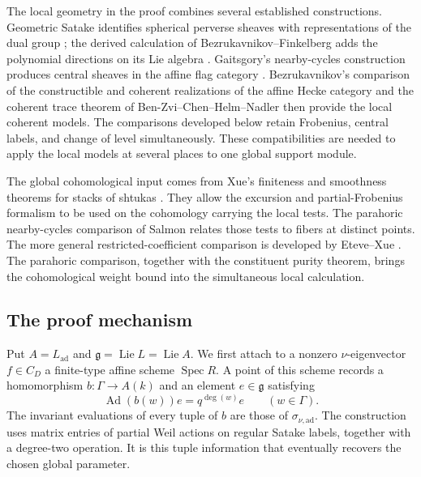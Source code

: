 \documentclass[11pt]{article}
\numberwithin{equation}{section}
\theoremstyle{definition}
\theoremstyle{remark}
\newcommand{\g}{\mathfrak g}
\newcommand{\Ad}{\operatorname{Ad}}
\newcommand{\Lie}{\operatorname{Lie}}
\newcommand{\Spec}{\operatorname{Spec}}
\begin{document}
The local geometry in the proof combines several established
constructions.  Geometric Satake identifies spherical perverse
sheaves with representations of the dual group
\cite{history:MV}; the derived calculation of
Bezrukavnikov--Finkelberg adds the polynomial directions on its
Lie algebra \cite{history:BF}.
Gaitsgory's nearby-cycles construction produces central sheaves
in the affine flag category \cite{history:Gaitsgory}.
Bezrukavnikov's comparison of the constructible and coherent
realizations of the affine Hecke category
\cite{Enh:Bezrukavnikov} and the coherent trace theorem of
Ben-Zvi--Chen--Helm--Nadler \cite{Local:BZCHN} then provide the
local coherent models.  The comparisons developed below retain
Frobenius, central labels, and change of level simultaneously.
These compatibilities are needed to apply the local models at
several places to one global support module.

The global cohomological input comes from Xue's finiteness and
smoothness theorems for stacks of shtukas
\cite{Bounds:XueFiniteness,Bounds:XueSmoothness}.
They allow the excursion and partial-Frobenius formalism to be
used on the cohomology carrying the local tests.  The parahoric nearby-cycles
comparison of Salmon \cite[Theorem~5.2(1)]{Bounds:SalmonNearby}
relates those tests to fibers at distinct points.  The more general
restricted-coefficient comparison is developed by Eteve--Xue
\cite{Bounds:EteveXueNearby}.  The parahoric comparison, together
with the constituent purity theorem, brings the cohomological
weight bound into the simultaneous local calculation.


\subsection{The proof mechanism}

Put $A=L_{\mathrm{ad}}$ and $\g=\Lie L=\Lie A$.
We first attach to a nonzero $\nu$-eigenvector $f\in C_D$ a
finite-type affine scheme $\Spec R$.  A point of this scheme records a homomorphism
$b:\Gamma\to A(k)$ and an element $e\in\g$ satisfying
\begin{equation}\label{intro:scaling}
       \Ad(b(w))e=q^{\deg(w)}e\qquad(w\in\Gamma).
\end{equation}
The invariant evaluations of every tuple of $b$ are those of
$\sigma_{\nu,\mathrm{ad}}$.  The construction uses matrix entries
of partial Weil actions on regular Satake labels, together with a
degree-two operation.  It is this tuple information that eventually
recovers the chosen global parameter.
\end{document}
